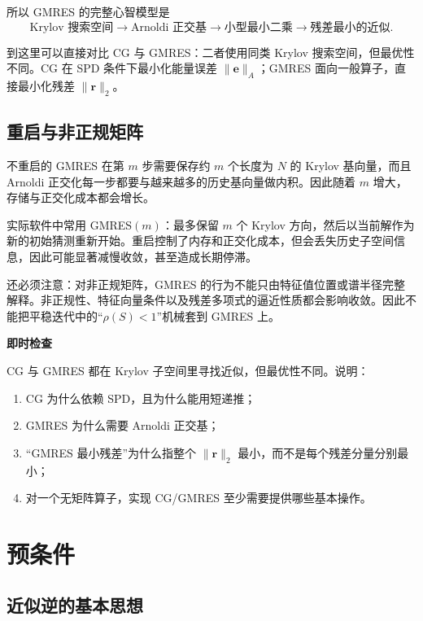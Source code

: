 所以 GMRES 的完整心智模型是
\begin{equation}
\boxed{
\text{Krylov 搜索空间}
\rightarrow
\text{Arnoldi 正交基}
\rightarrow
\text{小型最小二乘}
\rightarrow
\text{残差最小的近似}.
}
\end{equation}

到这里可以直接对比 CG 与 GMRES：二者使用同类 Krylov 搜索空间，但最优性不同。CG 在 SPD 条件下最小化能量误差 $\|\bm e\|_A$；GMRES 面向一般算子，直接最小化残差 $\|\bm r\|_2$。

\subsection{重启与非正规矩阵}

不重启的 GMRES 在第 $m$ 步需要保存约 $m$ 个长度为 $N$ 的 Krylov 基向量，而且 Arnoldi 正交化每一步都要与越来越多的历史基向量做内积。因此随着 $m$ 增大，存储与正交化成本都会增长。

实际软件中常用 GMRES$(m)$：最多保留 $m$ 个 Krylov 方向，然后以当前解作为新的初始猜测重新开始。重启控制了内存和正交化成本，但会丢失历史子空间信息，因此可能显著减慢收敛，甚至造成长期停滞。

还必须注意：对非正规矩阵，GMRES 的行为不能只由特征值位置或谱半径完整解释。非正规性、特征向量条件以及残差多项式的逼近性质都会影响收敛。因此不能把平稳迭代中的“$\rho(S)<1$”机械套到 GMRES 上。

\begin{checkpointbox}
\textbf{即时检查}

CG 与 GMRES 都在 Krylov 子空间里寻找近似，但最优性不同。说明：
\begin{enumerate}
\item CG 为什么依赖 SPD，且为什么能用短递推；
\item GMRES 为什么需要 Arnoldi 正交基；
\item “GMRES 最小残差”为什么指整个 $\|\bm r\|_2$ 最小，而不是每个残差分量分别最小；
\item 对一个无矩阵算子，实现 CG/GMRES 至少需要提供哪些基本操作。
\end{enumerate}
\end{checkpointbox}

\section{预条件}
\label{sec:preconditioning}

\subsection{近似逆的基本思想}

